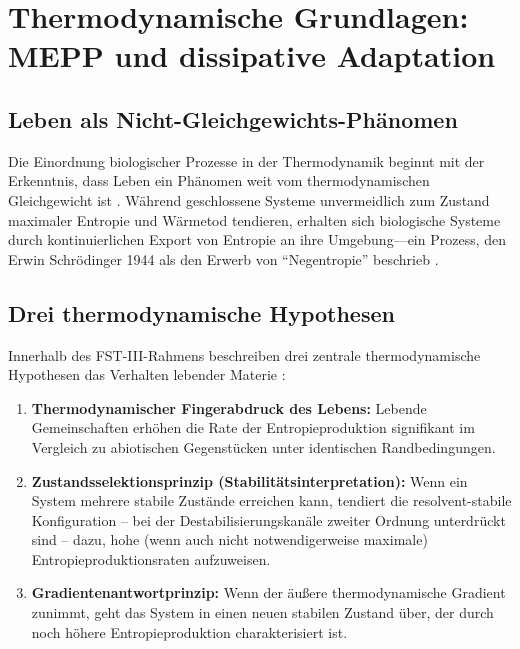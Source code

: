 \documentclass[12pt,a4paper]{article}
\theoremstyle{remark}
\begin{document}
\section{Thermodynamische Grundlagen: MEPP und dissipative Adaptation}
\label{sec:thermodynamics}

\subsection{Leben als Nicht-Gleichgewichts-Ph\"anomen}

Die Einordnung biologischer Prozesse in der Thermodynamik beginnt mit der Erkenntnis, dass Leben ein Ph\"anomen weit vom thermodynamischen Gleichgewicht ist \citep{EcosystemMEPP}. W\"ahrend geschlossene Systeme unvermeidlich zum Zustand maximaler Entropie und W\"armetod tendieren, erhalten sich biologische Systeme durch kontinuierlichen Export von Entropie an ihre Umgebung---ein Prozess, den Erwin Schr\"odinger 1944 als den Erwerb von ``Negentropie'' beschrieb \citep{EcosystemMEPP}.

\subsection{Drei thermodynamische Hypothesen}

Innerhalb des FST-III-Rahmens beschreiben drei zentrale thermodynamische Hypothesen das Verhalten lebender Materie \citep{EcosystemMEPP}:

\begin{enumerate}
    \item \textbf{Thermodynamischer Fingerabdruck des Lebens:} Lebende Gemeinschaften erh\"ohen die Rate der Entropieproduktion signifikant im Vergleich zu abiotischen Gegenst\"ucken unter identischen Randbedingungen.

    \item \textbf{Zustandsselektionsprinzip (Stabilit\"atsinterpretation):} Wenn ein System mehrere stabile Zust\"ande erreichen kann, tendiert die resolvent-stabile Konfiguration -- bei der Destabilisierungskan\"ale zweiter Ordnung unterdr\"uckt sind -- dazu, hohe (wenn auch nicht notwendigerweise maximale) Entropieproduktionsraten aufzuweisen.

    \item \textbf{Gradientenantwortprinzip:} Wenn der \"au\ss{}ere thermodynamische Gradient zunimmt, geht das System in einen neuen stabilen Zustand \"uber, der durch noch h\"ohere Entropieproduktion charakterisiert ist.
\end{enumerate}
\end{document}
